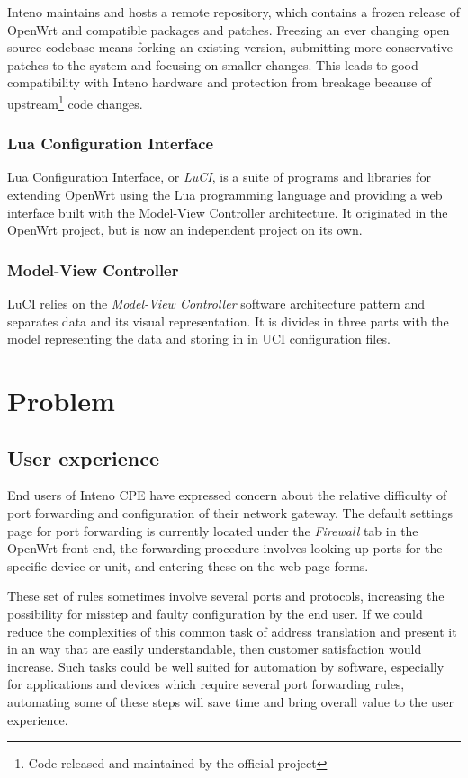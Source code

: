 \documentclass[a4paper,11pt,makeidx]{kth-bcs}
\begin{document}
Inteno maintains and hosts a remote repository, which contains a frozen release of OpenWrt and compatible packages and patches.
Freezing an ever changing open source codebase means forking an existing version, submitting more conservative patches to the system and focusing on smaller changes.
This leads to good compatibility with Inteno hardware and protection from breakage because of upstream\footnote{Code released and maintained by the official project} code changes.

\subsection{Lua Configuration Interface}\label{sec:LuCI}
Lua Configuration Interface, or \emph{LuCI}, is a suite of programs and libraries for extending OpenWrt using the Lua programming language and providing a web interface built with the Model-View Controller architecture.
It originated in the OpenWrt project, but is now an independent project on its own.

\subsection{Model-View Controller}
LuCI relies on the \emph{Model-View Controller} software architecture pattern and separates data and its visual representation.
It is divides in three parts with the model representing the data and storing in in UCI configuration files.

\chapter{Problem}
   \section{User experience}
End users of Inteno CPE have expressed concern about the relative difficulty of port forwarding and configuration of their network gateway.
The default settings page for port forwarding is currently located under the \emph{Firewall} tab in the OpenWrt front end, the forwarding procedure involves looking up ports for the specific device or unit, and entering these on the web page forms.

These set of rules sometimes involve several ports and protocols, increasing the possibility for misstep and faulty configuration by the end user.
If we could reduce the complexities of this common task of address translation and present it in an way that are easily understandable, then customer satisfaction would increase.
Such tasks could be well suited for automation by software, especially for applications and devices which require several port forwarding rules, automating some of these steps will save time and bring overall value to the user experience.
\end{document}
